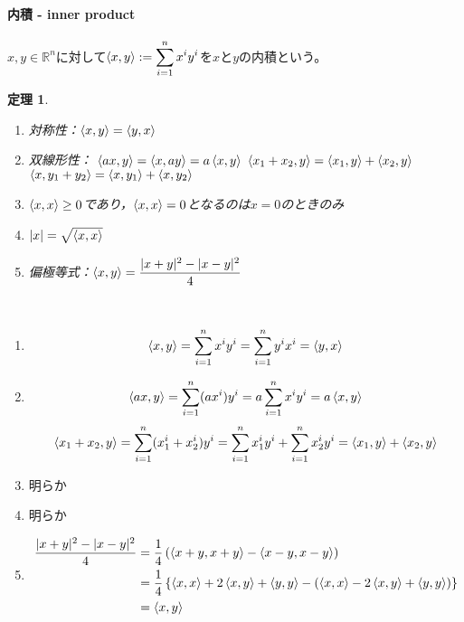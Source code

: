 \documentclass[dvipdfmx,a4j,10pt]{jsarticle}
\makeatletter
\theoremstyle{mystyle1}
\newtheorem{thm}[dfn]{定理}
\theoremstyle{mystyle2}
\renewenvironment{proof}[1][\proofname]{\par
  \pushQED{\qed}%
  \normalfont
  \topsep6\p@\@plus6\p@ \trivlist
  \item[\hskip\labelsep{\bfseries\sffamily #1}]\ignorespaces
}{%
  \popQED\endtrivlist\@endpefalse
}
\renewcommand\proofname{証明}
\makeatother
\begin{document}
\paragraph{内積 - inner product}
$x,y\in\mathbb{R}^n$に対して$\displaystyle\braket{x,y}:=\sum_{i=1}^nx^iy^i$を$x$と$y$の内積という。
\begin{framed}
\begin{thm}\
\begin{enumerate}
	\item 対称性：$\braket{x,y}=\braket{y,x}$
	\item 双線形性：
	$\braket{ax,y}=\braket{x,ay}=a\braket{x,y}$
	$\braket{x_1+x_2,y}=\braket{x_1,y}+\braket{x_2,y}$
	$\braket{x,y_1+y_2}=\braket{x,y_1}+\braket{x,y_2}$
	\item $\braket{x,x}\geq0$であり，$\braket{x,x}=0$となるのは$x=0$のときのみ
	\item $|x|=\sqrt{\braket{x,x}}$
	\item 偏極等式：$\displaystyle\braket{x,y}=\frac{|x+y|^2-|x-y|^2}{4}$\footnotemark
	\end{enumerate}
\end{thm}
\end{framed}
\begin{proof}　
\begin{enumerate}
	\item \[\braket{x,y}=\sum_{i=1}^nx^iy^i= \sum_{i=1}^ny^ix^i=\braket{y,x}\]
	\item \[\braket{ax,y}= \sum_{i=1}^n(ax^i)y^i=a \sum_{i=1}^nx^iy^i=a\braket{x,y}\]
	\[\braket{x_1+x_2,y}= \sum_{i=1}^n(x_1^i+x_2^i)y^i= \sum_{i=1}^nx_1^iy^i+ \sum_{i=1}^nx_2^iy^i=\braket{x_1,y}+\braket{x_2,y}\]
	\item 明らか
	\item 明らか
	\item
	\[
	\begin{split}
	\frac{|x+y|^2-|x-y|^2}{4}&=\frac{1}{4}\left(\braket{x+y,x+y}-\braket{x-y,x-y}\right)\\
	&=\frac{1}{4}\left\{\braket{x,x}+2\braket{x,y}+\braket{y,y}-(\braket{x,x}-2\braket{x,y}+\braket{y,y})\right\}\\
	&=\braket{x,y}
	\end{split}
	\]
\end{enumerate}

\end{proof}

\newpage
\end{document}
